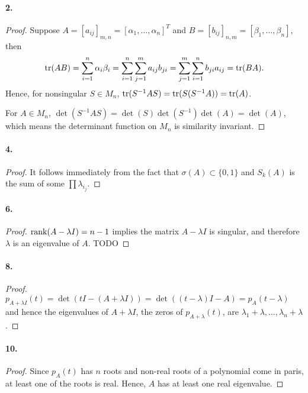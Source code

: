   \paragraph{2.}
  \begin{proof}
    Suppose $A = [a_{ij}]_{m,n} = [\alpha_1,\dots,\alpha_n]^T$ and $B = 
    [b_{ij}]_{n,m} = [\beta_1,\dots,\beta_n]$, then
    \[
      \operatorname{tr}(AB)=\sum_{i=1}^n\alpha_i\beta_i
      =\sum_{i=1}^n\sum_{j=1}^ma_{ij}b_{ji}
      =\sum_{j=1}^m\sum_{i=1}^nb_{ji}a_{ij}
      =\operatorname{tr}(BA).
    \]
    Hence, for nonsingular $S\in M_n$, $\operatorname{tr}(S^{-1}AS)=\operatorname{tr}(S(S^{-1}A)) = \operatorname{tr}(A)$.
    \par For $A\in M_n$, $\det(S^{-1}AS) = \det(S)\det(S^{-1})\det(A)=\det(A)$,
    which means the determinant function on $M_n$ is similarity invariant.
  \end{proof}

  \paragraph{4.}
  \begin{proof}
    It follows immediately from the fact that $\sigma(A)\subset\{0, 1\}$ and 
    $S_k(A)$ is the sum of some $\prod\lambda_{i_j}$. 
  \end{proof}

  \paragraph{6.}
  \begin{proof}
    $\operatorname{rank}(A-\lambda I)=n-1$ implies the matrix $A-\lambda I$ is singular, and
    therefore $\lambda$ is an eigenvalue of $A$. TODO
  \end{proof}

  \paragraph{8.}
  \begin{proof}
    $p_{A+\lambda I}(t)=\det(tI-(A+\lambda I))=\det((t-\lambda)I-A)=p_A(t-
    \lambda)$ and hence the eigenvalues of $A+\lambda I$, the zeros of $p_{A+
    \lambda}(t)$, are $\lambda_1+\lambda,\dots, \lambda_n+\lambda$.
  \end{proof}

  \paragraph{10.}
  \begin{proof}
    Since $p_A(t)$ has $n$ roots and non-real roots of a polynomial come in 
    paris, at least one of the roots is real. Hence, $A$ has at least one real
    eigenvalue.
  \end{proof}

